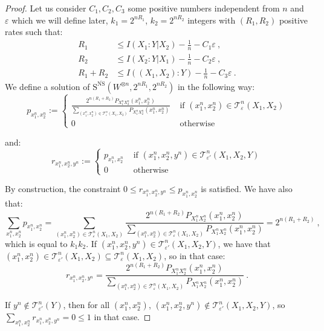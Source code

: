 \begin{proof}
  Let us consider $C_1,C_2,C_3$ some positive numbers independent from $n$ and $\varepsilon$ which we will define later,  $k_1 = 2^{nR_1}$, $k_2 = 2^{nR_2}$ integers with $(R_1,R_2)$ positive rates such that:
  \begin{equation}
      \begin{aligned}
        R_1 &\leq I(X_1:Y|X_2) - \frac{1}{n} - C_1\varepsilon \ ,\\
        R_2 &\leq I(X_2:Y|X_1) - \frac{1}{n} - C_2\varepsilon \ ,\\
        R_1+R_2 &\leq I((X_1,X_2):Y) - \frac{1}{n} - C_3\varepsilon \ .
      \end{aligned}
    \end{equation}
  We define a solution of $\mathrm{S}^{\overline{\mathrm{NS}}}(W^{\otimes n},2^{nR_1},2^{nR_2})$ in the following way:
  \[ p_{x_1^n,x_2^n} := \begin{cases}
    \frac{2^{n(R_1+R_2)}P_{X_1^nX_2^n}(x_1^n,x_2^n)}{\sum_{(x_1^n,x_2^n) \in \mathcal{T}^n_{\varepsilon}(X_1,X_2)}P_{X_1^nX_2^n}(x_1^n,x_2^n)} & \text{ if } (x_1^n,x_2^n) \in \mathcal{T}^n_{\varepsilon}(X_1,X_2) \\
    0 & \text{ otherwise}
  \end{cases}
  \]

  and:
  \[ r_{x_1^n,x_2^n,y^n} := \begin{cases}
    p_{x_1^n,x_2^n} & \text{ if } (x_1^n,x_2^n,y^n) \in \mathcal{T}^n_{\varepsilon'}(X_1,X_2,Y) \\
    0 & \text{ otherwise}
  \end{cases}
    \]

    By construction, the constraint $0 \leq r_{x_1^n,x_2^n,y^n} \leq p_{x_1^n,x_2^n}$ is satisfied. We have also that:
    \[\sum_{x_1^n,x_2^n} p_{x_1^n,x_2^n} = \sum_{(x_1^n,x_2^n) \in \mathcal{T}^n_{\varepsilon}(X_1,X_2)} \frac{2^{n(R_1+R_2)}P_{X_1^nX_2^n}(x_1^n,x_2^n)}{\sum_{(x_1^n,x_2^n) \in \mathcal{T}^n_{\varepsilon}(X_1,X_2)}P_{X_1^nX_2^n}(x_1^n,x_2^n)} = 2^{n(R_1+R_2)} \ , \]
    which is equal to $k_1k_2$. If $(x_1^n,x_2^n,y^n) \in \mathcal{T}^n_{\varepsilon'}(X_1,X_2,Y)$, we have that $(x_1^n,x_2^n) \in \mathcal{T}^n_{\varepsilon'}(X_1,X_2) \subseteq \mathcal{T}^n_{\varepsilon}(X_1,X_2)$, so in that case:
    \[ r_{x_1^n,x_2^n,y^n} = \frac{2^{n(R_1+R_2)}P_{X_1^nX_2^n}(x_1^n,x_2^n)}{\sum_{(x_1^n,x_2^n) \in \mathcal{T}^n_{\varepsilon}(X_1,X_2)}P_{X_1^nX_2^n}(x_1^n,x_2^n)} \ . \]

    If $y^n \not\in \mathcal{T}^n_{\varepsilon'}(Y)$, then for all $(x_1^n,x_2^n)$, $(x_1^n,x_2^n,y^n) \notin \mathcal{T}^n_{\varepsilon'}(X_1,X_2,Y)$, so $\sum_{x_1^n,x_2^n} r_{x_1^n,x_2^n,y^n}  = 0 \leq 1$ in that case.


\end{proof}
